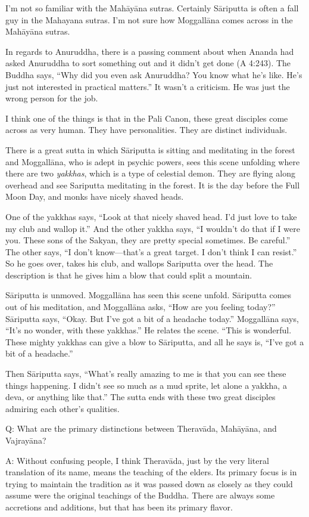 I’m not so familiar with the Mahāyāna sutras. Certainly Sāriputta is
often a fall guy in the Mahayana sutras. I’m not sure how Moggallāna
comes across in the Mahāyāna sutras.

In regards to Anuruddha, there is a passing comment about when Ananda
had asked Anuruddha to sort something out and it didn’t get done (A
4:243). The Buddha says, “Why did you even ask Anuruddha? You know what
he’s like. He’s just not interested in practical matters.” It wasn’t a
criticism. He was just the wrong person for the job.

I think one of the things is that in the Pali Canon, these great
disciples come across as very human. They have personalities. They are
distinct individuals.

There is a great sutta in which Sāriputta is sitting and meditating in
the forest and Moggallāna, who is adept in psychic powers, sees this
scene unfolding where there are two \emph{yakkhas}, which is a type of
celestial demon. They are flying along overhead and see Sariputta
meditating in the forest. It is the day before the Full Moon Day, and
monks have nicely shaved heads.

One of the yakkhas says, “Look at that nicely shaved head. I’d just love
to take my club and wallop it.” And the other yakkha says, “I wouldn’t
do that if I were you. These sons of the Sakyan, they are pretty special
sometimes. Be careful.” The other says, “I don’t know—that’s a great
target. I don’t think I can resist.” So he goes over, takes his club,
and wallops Sariputta over the head. The description is that he gives
him a blow that could split a mountain.

Sāriputta is unmoved. Moggallāna has seen this scene unfold. Sāriputta
comes out of his meditation, and Moggallāna asks, “How are you feeling
today?” Sāriputta says, “Okay. But I’ve got a bit of a headache today.”
Moggallāna says, “It’s no wonder, with these yakkhas.” He relates the
scene. “This is wonderful. These mighty yakkhas can give a blow to
Sāriputta, and all he says is, “I’ve got a bit of a headache.”

Then Sāriputta says, “What’s really amazing to me is that you can see
these things happening. I didn’t see so much as a mud sprite, let alone
a yakkha, a deva, or anything like that.” The sutta ends with these two
great disciples admiring each other’s qualities.

Q: What are the primary distinctions between Theravāda, Mahāyāna, and
Vajrayāna?

A: Without confusing people, I think Theravāda, just by the very literal
translation of its name, means the teaching of the elders. Its primary
focus is in trying to maintain the tradition as it was passed down as
closely as they could assume were the original teachings of the Buddha.
There are always some accretions and additions, but that has been its
primary flavor.


